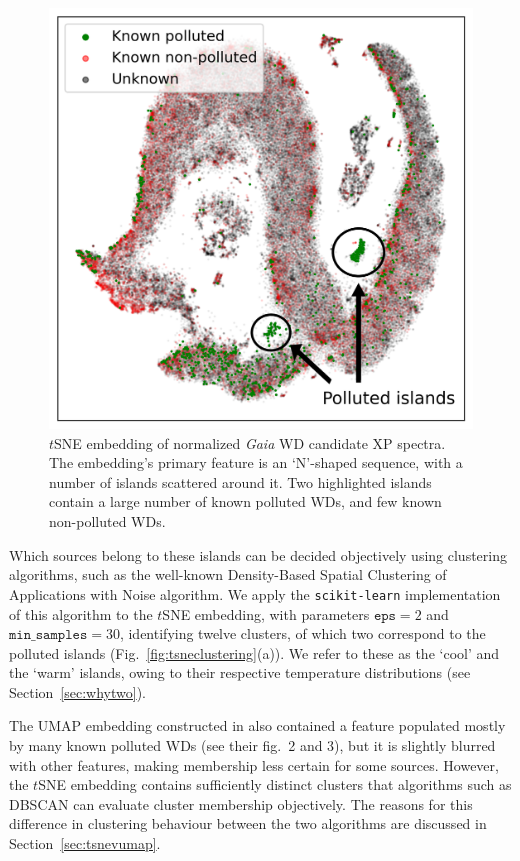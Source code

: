 \documentclass[fleqn,usenatbib]{rasti}
\begin{document}
\begin{figure}
\centering
\includegraphics[width=\columnwidth]{figures/fig1_tsneembedding.png}
\caption{
    $t$SNE embedding of normalized \textit{Gaia} WD candidate XP spectra.
    The embedding's primary feature is an `N'-shaped sequence, with a number of islands scattered around it.
    Two highlighted islands contain a large number of known polluted WDs, and few known non-polluted WDs.
}
\label{fig:tsneembedding}
\end{figure}

Which sources belong to these islands can be decided objectively using clustering algorithms, such as the well-known Density-Based Spatial Clustering of Applications with Noise \citep[DBSCAN;][]{ester96} algorithm.
We apply the \texttt{scikit-learn} implementation of this algorithm to the $t$SNE embedding, with parameters $\mathtt{eps}=2$ and $\mathtt{min\_samples}=30$, identifying twelve clusters, of which two correspond to the polluted islands (Fig.~\ref{fig:tsneclustering}(a)).
We refer to these as the `cool' and the `warm' islands, owing to their respective temperature distributions (see Section~\ref{sec:whytwo}).

The UMAP embedding constructed in \citet{kao24} also contained a feature populated mostly by many known polluted WDs (see their fig.~2 and 3), but it is slightly blurred with other features, making membership less certain for some sources.
However, the $t$SNE embedding contains sufficiently distinct clusters that algorithms such as DBSCAN can evaluate cluster membership objectively.
The reasons for this difference in clustering behaviour between the two algorithms are discussed in Section~\ref{sec:tsnevumap}.
\end{document}
